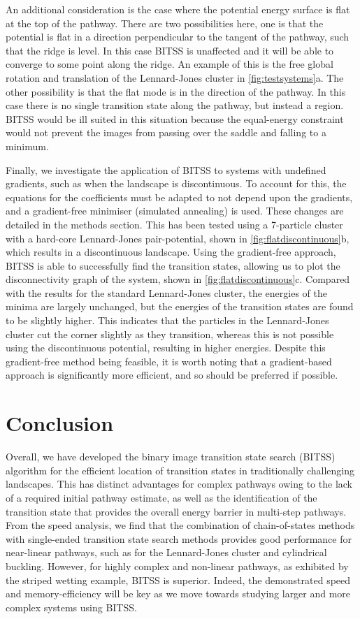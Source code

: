 \documentclass[aip,jcp,reprint,twocolumn]{revtex4-1}
\begin{document}
An additional consideration is the case where the potential energy surface is flat at the top of the pathway.
There are two possibilities here, one is that the potential is flat in a direction perpendicular to the tangent of the pathway, such that the ridge is level.
In this case BITSS is unaffected and it will be able to converge to some point along the ridge.
An example of this is the free global rotation and translation of the Lennard-Jones cluster in \cref{fig:testsystems}a.
The other possibility is that the flat mode is in the direction of the pathway.
In this case there is no single transition state along the pathway, but instead a region.
BITSS would be ill suited in this situation because the equal-energy constraint would not prevent the images from passing over the saddle and falling to a minimum.

Finally, we investigate the application of BITSS to systems with undefined gradients, such as when the landscape is discontinuous.
To account for this, the equations for the coefficients must be adapted to not depend upon the gradients, and a gradient-free minimiser (simulated annealing) is used.
These changes are detailed in the methods section.
This has been tested using a 7-particle cluster with a hard-core Lennard-Jones pair-potential, shown in \cref{fig:flatdiscontinuous}b, which results in a discontinuous landscape.
Using the gradient-free approach, BITSS is able to successfully find the transition states, allowing us to plot the disconnectivity graph of the system, shown in \cref{fig:flatdiscontinuous}c.
Compared with the results for the standard Lennard-Jones cluster, the energies of the minima are largely unchanged, but the energies of the transition states are found to be slightly higher.
This indicates that the particles in the Lennard-Jones cluster cut the corner slightly as they transition, whereas this is not possible using the discontinuous potential, resulting in higher energies.
Despite this gradient-free method being feasible, it is worth noting that a gradient-based approach is significantly more efficient, and so should be preferred if possible.


\section{Conclusion}
Overall, we have developed the binary image transition state search (BITSS) algorithm for the efficient location of transition states in traditionally challenging landscapes.
This has distinct advantages for complex pathways owing to the lack of a required initial pathway estimate, as well as the identification of the transition state that provides the overall energy barrier in multi-step pathways.
From the speed analysis, we find that the combination of chain-of-states methods with single-ended transition state search methods provides good performance for near-linear pathways, such as for the Lennard-Jones cluster and cylindrical buckling.
However, for highly complex and non-linear pathways, as exhibited by the striped wetting example, BITSS is superior.
Indeed, the demonstrated speed and memory-efficiency will be key as we move towards studying larger and more complex systems using BITSS.
\end{document}

